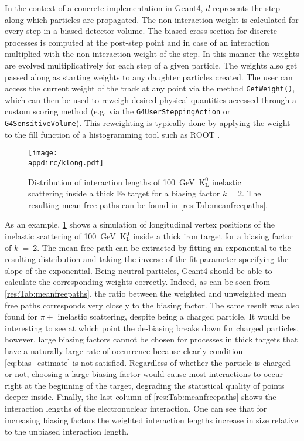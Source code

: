 %
In the context of a concrete implementation in Geant4, $d$ represents the step along which particles are propagated. The non-interaction weight is calculated for every step in a biased detector volume. The biased cross section for discrete processes is computed at the post-step point and in case of an interaction multiplied with the non-interaction weight of the step. In this manner the weights are evolved multiplicatively for each step of a given particle. The weights also get passed along as starting weights to any daughter particles created. The user can access the current weight of the track at any point via the method \verb|GetWeight()|, which can then be used to reweigh desired physical quantities accessed through a custom scoring method (e.g. via the \verb|G4UserSteppingAction| or \verb|G4SensitiveVolume|). This reweighting is typically done by applying the weight to the fill function of a histogramming tool such as ROOT \cite{root}.

\begin{figure}[htb]
  \centering
  \texttt{[image: \\appdirc/klong.pdf]}
  \caption[Distribution of interaction lengths of $\mathrm{K^0_L}$ inelastic scattering.] {Distribution of interaction lengths of 100~GeV~$\mathrm{K^0_L}$ inelastic scattering inside a thick Fe target for a biasing factor $k=2$. The resulting mean free paths can be found in \ref{res:Tab:meanfreepaths}.}
  \label{res:fig:klong}
\end{figure}

As an example, \ref{res:fig:klong} shows a simulation of longitudinal vertex positions of the inelastic scattering of 100~GeV~$\mathrm{K^0_L}$ inside a thick iron target for a biasing factor of $k$~=~2. The mean free path can be extracted by fitting an exponential to the resulting distribution and taking the inverse of the fit parameter specifying the slope of the exponential. Being neutral particles, Geant4 should be able to calculate the corresponding weights correctly. Indeed, as can be seen from \ref{res:Tab:meanfreepaths}, the ratio between the weighted and unweighted mean free paths corresponds very closely to the biasing factor. The same result was also found for $\pi+$ inelastic scattering, despite being a charged particle. It would be interesting to see at which point the de-biasing breaks down for charged particles, however, large biasing factors cannot be chosen for processes in thick targets that have a naturally large rate of occurrence because clearly condition \ref{eq:bias_estimate} is not satisfied. Regardless of whether the particle is charged or not, choosing a large biasing factor would cause most interactions to occur right at the beginning of the target, degrading the statistical quality of points deeper inside. Finally, the last column of \ref{res:Tab:meanfreepaths} shows the interaction lengths of the electronuclear interaction. One can see that for increasing biasing factors the weighted interaction lengths increase in size relative to the unbiased interaction length.


